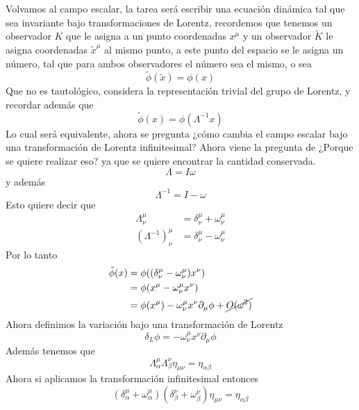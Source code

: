 \documentclass[../main.tex]{subfiles}
\begin{document}
 Volvamos al campo escalar, la tarea será escribir una ecuación dinámica tal que sea invariante bajo transformaciones de Lorentz, recordemos que tenemos un observador $K$ que le asigna a un punto coordenadas $x^\mu$ y un observador $\tilde{K}$ le asigna coordenadas $\tilde{x}^\mu$ al mismo punto, a este punto del espacio se le asigna un número, tal que para ambos observadores el número sea el mismo, o sea
\begin{equation}
  \tilde{\phi}(\tilde{x}) = \phi(x)
 \end{equation}
 Que no es tautológico, considera la representación trivial del grupo de Lorentz, y recordar además que
 \begin{equation*}
   \tilde{\phi}(x) = \phi(\Lambda^{-1}x)
 \end{equation*}
Lo cual será equivalente, ahora se pregunta ¿cómo cambia el campo escalar bajo una transformación de Lorentz infinitesimal? Ahora viene la pregunta de ¿Porque se quiere realizar eso? ya que se quiere encontrar la cantidad conservada.
\begin{equation*}
  \Lambda = I \omega
\end{equation*}
y además 
\begin{equation*}
  \Lambda^{-1} = I - \omega
\end{equation*}
Esto quiere decir que
\begin{align*}
  \Lambda_\nu^\mu & = \delta_\nu^\mu + \omega^\mu_\nu \\
  \left( \Lambda^{-1} \right)^\mu_\nu & = \delta_\nu^\mu - \omega^\mu_\nu
\end{align*}
Por lo tanto
\begin{align*}
  \tilde{\phi}(x) & = \phi((\delta_\nu^\mu-\omega^\mu_\nu)x^\nu) \\
  & = \phi(x^\mu - \omega^\mu_\nu x^\nu) \\
  & = \phi(x^\mu) - \omega^\mu_\nu x^\nu \partial_\mu\phi + \cancel{O(\omega^2)}
\end{align*}
Ahora definimos la variación bajo una transformación de Lorentz
\begin{equation}
  \delta_L \phi = -\omega^\mu_\nu x^\nu \partial_\mu \phi
 \end{equation}
 Además tenemos que
 \begin{equation*}
   \Lambda_\alpha^\mu \Lambda_\beta^\nu \eta_{\mu \nu} = \eta_{\alpha \beta}
 \end{equation*}
 Ahora si aplicamos la transformación infinitesimal entonces
 \begin{equation*}
   \left( \delta_\alpha^\mu + \omega^\mu_\alpha \right) \left( \delta^\nu_\beta + \omega^\nu_\beta \right)\eta_{\mu \nu} = \eta_{\alpha \beta} 
 \end{equation*}
\end{document}
